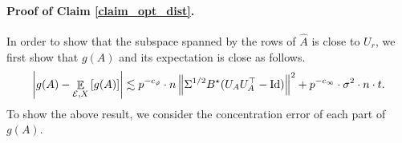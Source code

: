 	
	\iffalse
	Second, notice that
	\begin{align*}
			\exarg{\cE}{\cE A^{\top} (AA^{\top})^{+} A \cE^{\top}}
		&= \exarg{\cE}{\sum_{j=1}^t \sum_{k=1}^t \varepsilon^{(j)} A_j^{\top} (AA^{\top})^{+} A_k {\varepsilon^{(k)}}^{\top}} \\
		&= \exarg{\cE}{\sum_{j=1}^t \varepsilon^{(j)} A_j^{\top} (AA^{\top})^{+} A_j {\varepsilon^{(j)}}^{\top}} \\
		&= \sigma^2 \cdot r \cdot \id_{n\times n}.
	\end{align*}
	In the above derivation, the second step used the fact that for any $j\neq k$, $\varepsilon^{(j)}$ and $\varepsilon^{(k)}$ are pairwise independent.
	The third step used the fact that $\sum_{j=1}^t A_j^{\top} (AA^{\top})^{+} A_j = \bigtr{\id_{r\times r}} = r$, and $\ex{\varepsilon^{(j)} {\varepsilon^{(j)}}^{\top}} = \sigma^2 \cdot \id_{n\times n}$.
	Therefore, we have that
	\begin{align*}
		\exarg{\cE}{ \inner{\cW A}{\cE}} = \sigma^2 \cdot r \cdot \bigtr{X(X^{\top} X)^{-1} X^{\top}} =  \sigma^2 \cdot r \cdot \bigtr{ X^{\top}X(X^{\top} X)^{-1}}  = \sigma^2 \cdot r \cdot p.
	\end{align*}
   because $X^\top X$ is a $p\times p$ matrix.	
	Hence the proof is complete.
\fi

	\paragraph{Proof of Claim \ref{claim_opt_dist}.}
	In order to show that the subspace spanned by the rows of $\hat{A}$ is close to $U_r$, we first show that $g(A)$ and its expectation is close as follows.
	\begin{align}\label{eq_gA_err}
		{\left| {g(A) - \mathop{\mathbb{E}}_{\mathcal{E}, X}\left[ g(A) \right]} \right|} \lesssim p^{-c_{\varphi}} \cdot n \left\| \Sigma^{1/2} B^{\star} (U_AU_A^{\top} - \operatorname{Id}) \right\|^2 + p^{-c_{\infty}} \cdot \sigma^2 \cdot n \cdot t.
	\end{align}
	To show the above result, we consider the concentration error of each part of $g(A)$.

